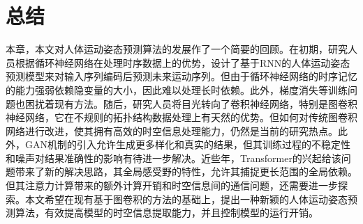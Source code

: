 
\section{总结}
本章，本文对人体运动姿态预测算法的发展作了一个简要的回顾。在初期，研究人员根据循环神经网络在处理时序数据上的优势，设计了基于RNN的人体运动姿态预测模型来对输入序列编码后预测未来运动序列。但由于循环神经网络的时序记忆的能力强弱依赖隐变量的大小，因此难以处理长时依赖。此外，梯度消失等训练问题也困扰着现有方法。随后，研究人员将目光转向了卷积神经网络，特别是图卷积神经网络，它在不规则的拓扑结构数据处理上有天然的优势。但如何对传统图卷积网络进行改进，使其拥有高效的时空信息处理能力，仍然是当前的研究热点。此外，GAN机制的引入允许生成更多样化和真实的结果，但其训练过程的不稳定性和噪声对结果准确性的影响有待进一步解决。近些年，Transformer的兴起给该问题带来了新的解决思路，其全局感受野的特性，允许其捕捉更长范围的全局依赖。但其注意力计算带来的额外计算开销和时空信息间的通信问题，还需要进一步探索。本文希望在现有基于图卷积的方法的基础上，提出一种新颖的人体运动姿态预测算法，有效提高模型的时空信息提取能力，并且控制模型的运行开销。


